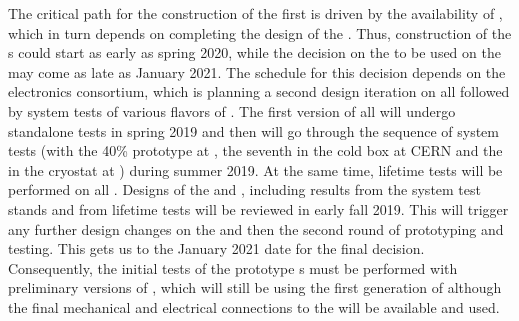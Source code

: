 The critical path for the construction of the first 
  is driven by the availability of ,
which in turn depends on completing the design of the
. Thus, construction
of the s could start as early as spring 2020, while the
decision on the  to be used on the 
may come as late as January 2021. The schedule for this decision
depends on the  electronics consortium, which is
planning a second design iteration on all 
followed by system tests of various flavors of .
The first version of all  will undergo
standalone tests in spring 2019 and then will go through the 
sequence of system tests (with the 40\%  prototype at ,
the seventh   in the cold box at CERN
and the  in the  cryostat at )
during summer 2019. At the same time, lifetime tests will be performed 
on all . Designs of the  and , including results
from the system test stands and from lifetime tests will be reviewed
in early fall 2019. This will trigger any further design
changes on the  and then the second round of prototyping
and testing. This gets us to the January 2021 date for the final
 decision. Consequently, the initial
tests of the  prototype s must be performed
with preliminary versions of , which will still be using
the first generation of  although the final 
mechanical and electrical connections to the  will be available and used.


